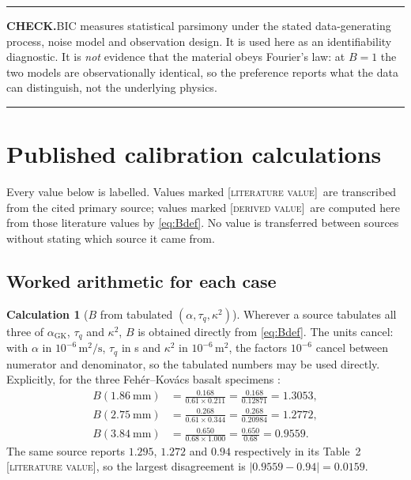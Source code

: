 \documentclass[11pt,a4paper]{article}
\theoremstyle{definition}
\newtheorem{calculationx}{Calculation}[section]
\newenvironment{checkbox}%
  {\par\medskip\noindent\begin{minipage}{\linewidth}%
   \rule{\linewidth}{0.4pt}\par\noindent\textbf{CHECK.}\enspace}%
  {\par\rule{\linewidth}{0.4pt}\end{minipage}\par\medskip}
\newcommand{\LIT}{\textcolor{blue!55!black}{\footnotesize[\textsc{literature value}]}}
\newcommand{\DER}{\textcolor{green!35!black}{\footnotesize[\textsc{derived value}]}}
\newcommand{\tq}{\tau_{q}}
\newcommand{\kk}{\kappa^{2}}
\newcommand{\Bnum}{B}
\begin{document}
\begin{checkbox}[Interpretation limit --- mandatory]
BIC measures statistical parsimony under the stated data-generating process,
noise model and observation design. It is used here as an identifiability
diagnostic. It is \emph{not} evidence that the material obeys Fourier's law:
at $\Bnum=1$ the two models are observationally identical, so the preference
reports what the data can distinguish, not the underlying physics.
\end{checkbox}

\section{Published calibration calculations}
\label{sec:calibrations}

Every value below is labelled. Values marked \LIT\ are transcribed from the
cited primary source; values marked \DER\ are computed here from those
literature values by \eqref{eq:Bdef}. No value is transferred between sources
without stating which source it came from.

\subsection{Worked arithmetic for each case}

\begin{calculationx}[$\Bnum$ from tabulated $(\alpha,\tq,\kk)$]
\label{calc:B-cases}
Wherever a source tabulates all three of $\alpha_{\mathrm{GK}}$, $\tq$ and
$\kk$, $\Bnum$ is obtained directly from \eqref{eq:Bdef}. The units cancel:
with $\alpha$ in $10^{-6}\,\si{\metre\squared\per\second}$, $\tq$ in
\si{\second} and $\kk$ in $10^{-6}\,\si{\metre\squared}$, the factors
$10^{-6}$ cancel between numerator and denominator, so the tabulated numbers
may be used directly. Explicitly, for the three Feh\'er--Kov\'acs basalt
specimens \cite{FeherKovacs2021}:
\begin{align}
  \Bnum(\SI{1.86}{\milli\metre})
   &= \frac{0.168}{0.61\times0.211}
    = \frac{0.168}{0.12871} = 1.3053 ,
  \label{eq:B-186}\\
  \Bnum(\SI{2.75}{\milli\metre})
   &= \frac{0.268}{0.61\times0.344}
    = \frac{0.268}{0.20984} = 1.2772 ,
  \label{eq:B-275}\\
  \Bnum(\SI{3.84}{\milli\metre})
   &= \frac{0.650}{0.68\times1.000}
    = \frac{0.650}{0.68} = 0.9559 .
  \label{eq:B-384}
\end{align}
The same source reports $1.295$, $1.272$ and $0.94$ respectively in its
Table~2 \LIT, so the largest disagreement is
$|0.9559-0.94| = 0.0159$.
\end{calculationx}
\end{document}
